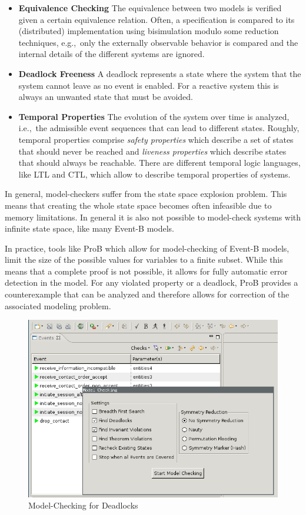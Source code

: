 \begin{itemize}
\item {\bf Equivalence Checking} The equivalence between two models is verified
  given a certain equivalence relation. Often, a specification is compared to
  its (distributed) implementation using bisimulation modulo some reduction
  techniques, e.g.,\ only the externally observable behavior is compared and the
  internal details of the different systems are ignored.
\item {\bf Deadlock Freeness} A deadlock represents a state where the system
  that the system cannot leave as no event is enabled. For a reactive system
  this is always an unwanted state that must be avoided.
\item {\bf Temporal Properties} The evolution of the system over time is
  analyzed, i.e.,\ the admissible event sequences that can lead to different
  states. Roughly, temporal properties comprise \emph{safety properties} which
  describe a set of states that should never be reached and \emph{liveness
    properties} which describe states that should always be reachable. There are
  different temporal logic languages, like LTL and CTL, which allow to describe
  temporal properties of systems.
\end{itemize}

In general, model-checkers suffer from the state space explosion problem. This
means that creating the whole state space becomes often infeasible due to memory
limitations. In general it is also not possible to model-check systems with
infinite state space, like many Event-B models.

In practice, tools like ProB which allow for model-checking of Event-B models,
limit the size of the possible values for variables to a finite subset. While
this means that a complete proof is not possible, it allows for fully automatic
error detection in the model. For any violated property or a deadlock, ProB
provides a counterexample that can be analyzed and therefore allows for
correction of the associated modeling problem.

\begin{figure}[ht]
  \centering
  \includegraphics[width=.5\textwidth]{figures/ProBModelChecking}
  \caption{Model-Checking for Deadlocks}
  \label{fig:Prob-model-check}
\end{figure}

